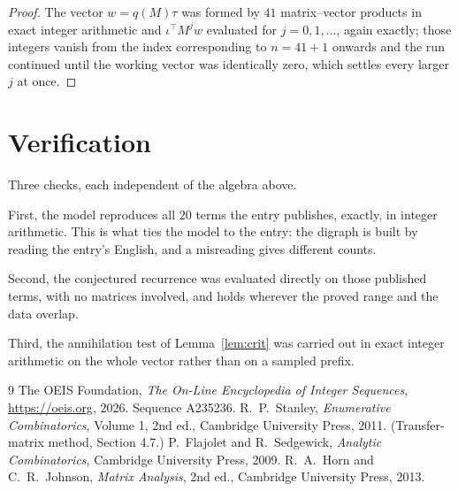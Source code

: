 \documentclass[11pt,a4paper]{article}
\theoremstyle{plain}
\theoremstyle{definition}
\begin{document}
\begin{proof}
The vector $w=q(M)\tau$ was formed by $41$ matrix--vector products in exact integer
arithmetic and $\iota^{\!\top}M^{j}w$ evaluated for $j=0,1,\dots$, again exactly; those
integers vanish from the index corresponding to $n=41+1$ onwards and the run continued
until the working vector was identically zero, which settles every larger $j$ at once.
\end{proof}

\section{Verification}

Three checks, each independent of the algebra above.

First, the model reproduces all $20$ terms the entry publishes, exactly, in integer
arithmetic. This is what ties the model to the entry: the digraph is built by reading the
entry's English, and a misreading gives different counts.

Second, the conjectured recurrence was evaluated directly on those published terms, with no
matrices involved, and holds wherever the proved range and the data overlap.

Third, the annihilation test of Lemma~\ref{lem:crit} was carried out in exact integer
arithmetic on the whole vector rather than on a sampled prefix.

\begin{thebibliography}{9}
 The OEIS Foundation, \emph{The On-Line Encyclopedia of Integer
Sequences}, \url{https://oeis.org}, 2026. Sequence A235236.
 R.~P.~Stanley, \emph{Enumerative Combinatorics}, Volume 1, 2nd ed.,
Cambridge University Press, 2011. (Transfer-matrix method, Section 4.7.)
 P.~Flajolet and R.~Sedgewick, \emph{Analytic Combinatorics}, Cambridge
University Press, 2009.
 R.~A.~Horn and C.~R.~Johnson, \emph{Matrix Analysis}, 2nd ed., Cambridge
University Press, 2013.
\end{thebibliography}
\end{document}
